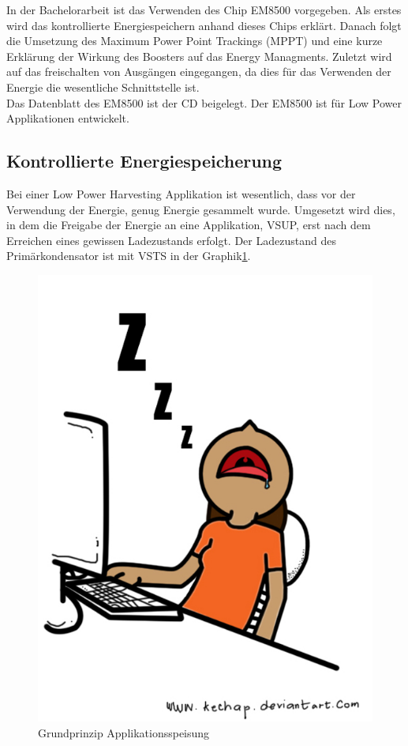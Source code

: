 In der Bachelorarbeit ist das Verwenden des Chip EM8500 vorgegeben. Als erstes wird das kontrollierte Energiespeichern anhand dieses Chips erklärt. Danach folgt die Umsetzung des Maximum Power Point Trackings (MPPT) und eine kurze Erklärung der Wirkung des Boosters auf das Energy Managments. Zuletzt wird auf das freischalten von Ausgängen eingegangen, da dies für das Verwenden der Energie die wesentliche Schnittstelle ist.\\

Das Datenblatt des EM8500 ist der CD beigelegt. Der EM8500 ist für Low Power Applikationen entwickelt.\\

\subsection{Kontrollierte Energiespeicherung}

Bei einer Low Power Harvesting Applikation ist wesentlich, dass vor der Verwendung der Energie, genug Energie gesammelt wurde. Umgesetzt wird dies, in dem die Freigabe der Energie an eine Applikation, VSUP, erst nach dem Erreichen eines gewissen Ladezustands erfolgt. Der Ladezustand des Primärkondensator ist mit VSTS in der Graphik\ref{em_grundprinzip}.

\begin{figure}
   \includegraphics{Idle.jpg}
   \caption{Grundprinzip Applikationsspeisung }\label{em_grundprinzip} 
\end{figure}

